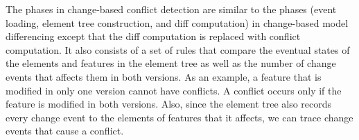 The phases in change-based conflict detection are similar to the phases (event loading, element tree construction, and diff computation) in change-based model differencing except that the diff computation is replaced with conflict computation. It also consists of a set of rules that compare the eventual states of the elements and features in the element tree as well as the number of change events that affects them in both versions. As an example, a feature that is modified in only one version cannot have conflicts. A conflict occurs only if the feature is modified in both versions. Also, since the element tree also records every change event to the elements of features that it affects, we can trace change events that cause a conflict.
